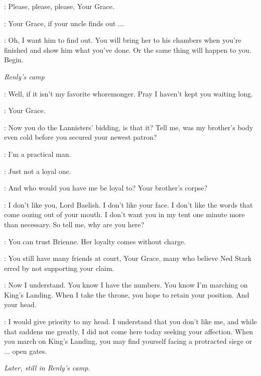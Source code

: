 \DAISY: Please, please, please, Your Grace. 

\ROS: Your Grace, if your uncle finds out $\ldots$  

\JOFFREY: Oh, I want him to find out. You will bring her to his chambers when you're finished and show him what you've done. Or the same thing will happen to you. Begin. 



\scene

\textit{Renly's camp} 


\RENLY: Well, if it isn't my favorite whoremonger. Pray I haven't kept you waiting long. 

\LITTLEFINGER: Your Grace. 

\RENLY: Now you do the Lannisters' bidding, is that it? Tell me, was my brother's body even cold before you secured your newest patron? 

\LITTLEFINGER: I'm a practical man. 

\RENLY: Just not a loyal one. 

\LITTLEFINGER: And who would you have me be loyal to? Your brother's corpse? 

\RENLY: I don't like you, Lord Baelish. I don't like your face. I don't like the words that come oozing out of your mouth. I don't want you in my tent one minute more than necessary. So tell me, why are you here? 


\RENLY: You can trust Brienne. Her loyalty comes without charge. 

\LITTLEFINGER: You still have many friends at court, Your Grace, many who believe Ned Stark erred by not supporting your claim. 

\RENLY: Now I understand. You know I have the numbers. You know I'm marching on King's Landing. When I take the throne, you hope to retain your position. And your head. 

\LITTLEFINGER: I would give priority to my head. I understand that you don't like me, and while that saddens me greatly, I did not come here today seeking your affection. When you march on King's Landing, you may find yourself facing a protracted siege or$\ldots$ open gates. 


\scene

\textit{Later, still in Renly's camp.} 

